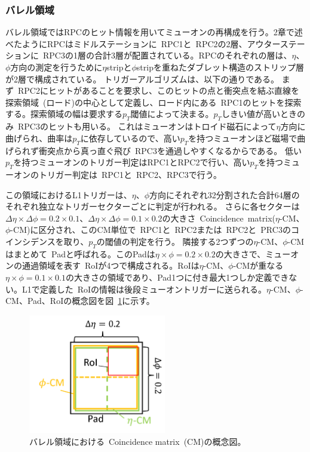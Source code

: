 \subsubsection{バレル領域}
バレル領域ではRPCのヒット情報を用いてミューオンの再構成を行う。2章で述べたようにRPCはミドルステーションに~RPC1と~RPC2の2層、アウターステーションに~RPC3の1層の合計3層が配置されている。RPCのそれぞれの層は、$\eta$、$\phi$方向の測定を行うために$\eta$stripと$\phi$stripを重ねたダブレット構造のストリップ層が2層で構成されている。
トリガーアルゴリズムは、以下の通りである。
まず~RPC2にヒットがあることを要求し、このヒットの点と衝突点を結ぶ直線を探索領域~(ロード)の中心として定義し、ロード内にある~RPC1のヒットを探索する。探索領域の幅は要求する$p_T$閾値によって決まる。$p_T$しきい値が高いときのみ~RPC3のヒットも用いる。
これはミューオンはトロイド磁石によって$\eta$方向に曲げられ、曲率は$p_T$に依存しているので、高い$p_T$を持つミューオンほど磁場で曲げられず衝突点から真っ直ぐ飛び~RPC3を通過しやすくなるからである。
低い$p_T$を持つミューオンのトリガー判定はRPC1とRPC2で行い、高い$p_T$を持つミューオンのトリガー判定は~RPC1と~RPC2、RPC3で行う。

この領域におけるL1トリガーは、$\eta$、$\phi$方向にそれぞれ32分割された合計64層のそれぞれ独立なトリガーセクターごとに判定が行われる。
さらに各セクターは$\Delta\eta\times\Delta\phi=0.2\times0.1$、$\Delta\eta\times\Delta\phi=0.1\times0.2$の大きさ~Coincidence~matrix($\eta$-CM、$\phi$-CM)に区分され、このCM単位で~RPC1と~RPC2または~RPC2と~PRC3のコインシデンスを取り、$p_T$の閾値の判定を行う。
隣接する2つずつの$\eta$-CM、$\phi$-CMはまとめて~Padと呼ばれる。このPadは$\eta\times\phi=0.2\times0.2$の大きさで、ミューオンの通過領域を表す~RoIが4つで構成される。RoIは$\eta$-CM、$\phi$-CMが重なる$\eta\times\phi=0.1\times0.1$の大きさの領域であり、Pad1つに付き最大1つしか定義できない。L1で定義した~RoIの情報は後段ミューオントリガーに送られる。$\eta$-CM、$\phi$-CM、Pad、RoIの概念図を図~\ref{fig:3-3}に示す。

\begin{figure}[h]
  \centering
  \includegraphics[clip, width=6cm]{fig/3/L1_CM.png}
  \caption{バレル領域における~Coincidence matrix~(CM)の概念図。}
  \label{fig:3-3}
\end{figure}

